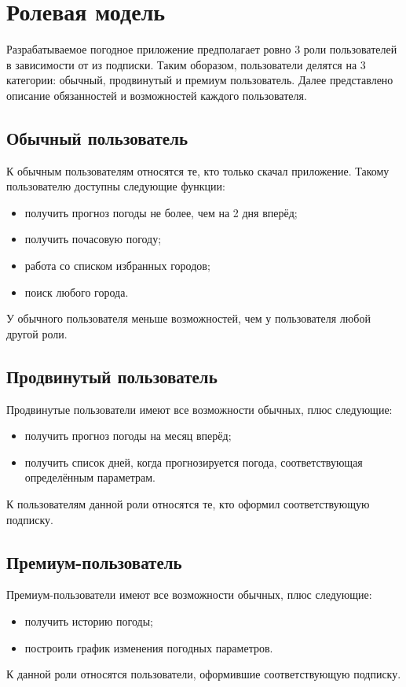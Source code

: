 \section{Ролевая модель}
Разрабатываемое погодное приложение предполагает ровно $3$ роли пользователей в зависимости от из подписки.
Таким оборазом, пользователи делятся на 3 категории: обычный, продвинутый и премиум пользователь.
Далее представлено описание обязанностей и возможностей каждого пользователя.

\subsection*{Обычный пользователь}
К обычным пользователям относятся те, кто только скачал приложение.
Такому пользователю доступны следующие функции:
\begin{itemize}
    \item получить прогноз погоды не более, чем на 2 дня вперёд;
    \item получить почасовую погоду;
    \item работа со списком избранных городов;
    \item поиск любого города.
\end{itemize}
У обычного пользователя меньше возможностей, чем у пользователя любой другой роли.

\subsection*{Продвинутый пользователь}
Продвинутые пользователи имеют все возможности обычных, плюс следующие:
\begin{itemize}
    \item получить прогноз погоды на месяц вперёд;
    \item получить список дней, когда прогнозируется погода, соответствующая определённым параметрам.
\end{itemize}
К пользователям данной роли относятся те, кто оформил соответствующую подписку.

\subsection*{Премиум-пользователь}
Премиум-пользователи имеют все возможности обычных, плюс следующие:
\begin{itemize}
    \item получить историю погоды;
    \item построить график изменения погодных параметров.
\end{itemize}
К данной роли относятся пользователи, оформившие соответствующую подписку.

